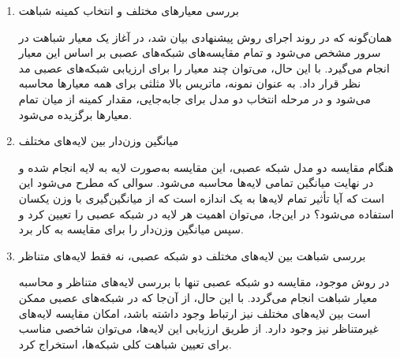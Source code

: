 \begin{enumerate}
	\item
	بررسی معیارهای مختلف و انتخاب کمینه شباهت
	
	همان‌گونه که در روند اجرای روش پیشنهادی بیان شد، در آغاز یک معیار شباهت در سرور مشخص می‌شود و تمام مقایسه‌های شبکه‌های عصبی بر اساس این معیار انجام می‌گیرد. با این حال، می‌توان چند معیار را برای ارزیابی شبکه‌های عصبی مد نظر قرار داد. به عنوان نمونه، ماتریس بالا ‌مثلثی برای همه معیارها محاسبه می‌شود و در مرحله انتخاب دو مدل برای جابه‌جایی، مقدار کمینه از میان تمام معیارها برگزیده می‌شود.
	
	
	\item
	میانگین وزن‌دار بین لایه‌های مختلف
	
هنگام مقایسه دو مدل شبکه عصبی، این مقایسه به‌صورت لایه به لایه انجام شده و در نهایت میانگین تمامی لایه‌ها محاسبه می‌شود. سوالی که مطرح می‌شود این است که آیا تأثیر تمام لایه‌ها به یک اندازه است که از میانگین‌گیری با وزن یکسان استفاده می‌شود؟ در این‌جا، می‌توان اهمیت هر لایه در شبکه عصبی را تعیین کرد و سپس میانگین وزن‌دار را برای مقایسه به کار برد.
	

	\item
بررسی شباهت بین لایه‌های مختلف دو شبکه عصبی، نه فقط لایه‌های متناظر

در روش موجود، مقایسه دو شبکه عصبی تنها با بررسی لایه‌های متناظر و محاسبه معیار شباهت انجام می‌گردد. با این حال، از آن‌جا که در شبکه‌های عصبی ممکن است بین لایه‌های مختلف نیز ارتباط وجود داشته باشد، امکان مقایسه لایه‌های غیرمتناظر نیز وجود دارد. از طریق ارزیابی این لایه‌ها، می‌توان شاخصی مناسب برای تعیین شباهت کلی شبکه‌ها، استخراج کرد.
\end{enumerate}

